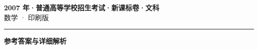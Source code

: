 \documentclass[zihao=5, a4paper]{ctexart}
\begin{document}
\begin{center}
  {\Large\bfseries 2007 年·普通高等学校招生考试·新课标卷·文科}\\[4pt]
  {\large 数学 · 印刷版}
\end{center}
\medskip
{}

\par\bigskip\hrule\bigskip
{}
\begin{center}{\large\bfseries 参考答案与详细解析}\end{center}
\smallskip

\end{document}
